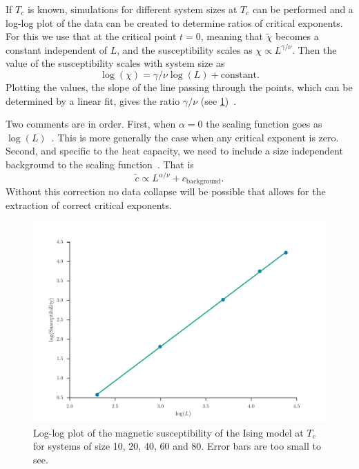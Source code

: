 \documentclass[11pt, a4paper]{report} %
\begin{document}
If \(T_c\) is known, simulations for different system sizes at \(T_c\) can be performed and a log-log plot of the data can be created to determine ratios of critical exponents.
For this we use that at the critical point \(t=0\), meaning that \(\widetilde{\chi}\) becomes a constant independent of \(L\), and the susceptibility scales as \(\chi \propto L^{\gamma/\nu}\).
Then the value of the susceptibility scales with system size as
\begin{equation}
	\log(\chi) = \gamma/\nu \log(L) + \mathrm{constant}.
\end{equation}
Plotting the values, the slope of the line passing through the points, which can be determined by a linear fit, gives the ratio \(\gamma/\nu\) (see \cref{fig:ising_magnetizabilities_loglog_plot})~\cite{corboz}.

Two comments are in order.
First, when \(\alpha =0\) the scaling function goes as \(\log(L)\)~\cite{landau:2015}.
This is more generally the case when any critical exponent is zero.
Second, and specific to the heat capacity, we need to include a size independent background to the scaling function~\cite{kim:1998}.
That is
\begin{equation}
	\widetilde{c} \propto L^{\alpha/\nu} + c_{\mathrm{background}}.
\end{equation}
Without this correction no data collapse will be possible that allows for the extraction of correct critical exponents.

\begin{figure}[htb]
	\centering
	\includegraphics[width=\linewidth]{ising_magnetizabilities_loglog_plot.pdf}
	\caption{Log-log plot of the magnetic susceptibility of the Ising model at \(T_c\) for systems of size 10, 20, 40, 60 and 80. Error bars are too small to see.}
	\label{fig:ising_magnetizabilities_loglog_plot}
\end{figure}
\end{document}
